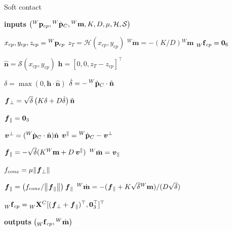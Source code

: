 \begin{algorithm}
\caption{Soft contact}
\label{algo:soft_contacts}
\begin{algorithmic}[1]
\small

\State \textbf{inputs} $\left( \pos[W]_{cp}, \posd[W]_C, {}^W \mathbf{m}, K, D, \mu, \mathcal{H}, \mathcal{S} \right)$

\State $x_{cp}, y_{cp}, z_{cp} = \pos[W]_{cp}$
\State $z_T = \mathcal{H}(x_{cp}, y_{cp})$
\State ${}^W \dot{\mathbf{m}} = -(K / D) {}^W \mathbf{m}$
\State $\forcesix[W]_{cp} = \zeros_6$

\State $\hat{\mathbf{n}} = \mathcal{S}(x_{cp}, y_{cp})$
\State $\mathbf{h} = \left[0, 0, z_T - z_{cp}\right]^\top$

\State $\delta = \max(0, \mathbf{h} \cdot \hat{\mathbf{n}})$
\State $\dot{\delta} = -\posd[W]_C \cdot \hat{\mathbf{n}}$

\State $\forcelin_\perp = \sqrt{\delta} \left( K \delta + D \dot{\delta} \right) \hat{\mathbf{n}}$

\State $\forcelin_\parallel = \zeros_3$
        
    \State $\vellin^\perp = (\posd[W]_C \cdot \hat{\mathbf{n}}) \hat{\mathbf{n}}$
    \State $\vellin^\parallel = \posd[W]_C - \vellin^\perp$

    \State $\forcelin_\parallel = -\sqrt{\delta}(K {}^W \mathbf{m} + D  \vellin^\parallel)$
    \State ${}^W \dot{\mathbf{m}} = \vellin_\parallel$

    \State $f_{cone} = \mu \norm{\forcelin_\perp}$
    
        \State $\forcelin_\parallel = \left(f_{cone} / \norm{\forcelin_\parallel}\right) \forcelin_\parallel$
        \State ${}^W \dot{\mathbf{m}} = -(\forcelin_\parallel + K \sqrt{\delta} {}^W \mathbf{m}) / (D \sqrt{\delta})$
    \EndIf
\EndIf

\State $\forcesix[W]_{cp} = \transfor[W]^C [(\forcelin_\perp + \forcelin_\parallel)^\top, \zeros^\top_3]^\top$

\State \textbf{outputs} $\left(\forcesix[W]_{cp}, {}^W \dot{\mathbf{m}}\right)$

\end{algorithmic}
\end{algorithm}

